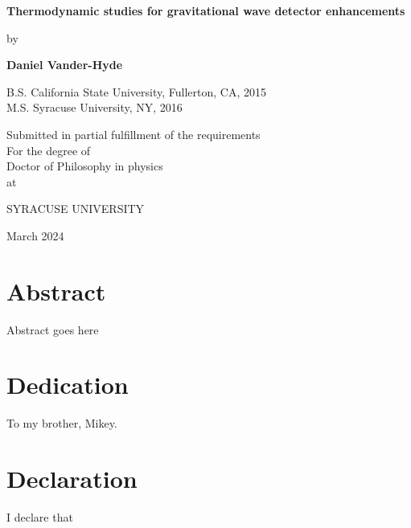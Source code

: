 \documentclass[12pt]{report}
\begin{document}
\begin{titlepage}
\begin{center}
       \vspace*{1cm}

       \textbf{\LARGE Thermodynamic studies for gravitational wave detector enhancements}

       \vspace{0.5cm}
       {\large by}
            
       \vspace{0.5cm}

       \textbf{\large Daniel Vander-Hyde}


       \vspace{0.5cm}
       {\large B.S. California State University, Fullerton, CA, 2015}
       \\
       {\large M.S. Syracuse University, NY, 2016}
       
       \vspace{1.0cm}
             
       {\large Submitted in partial fulfillment of the requirements\\
       For the degree of \\
       Doctor of Philosophy in physics\\
       at}

       \vspace{0.5cm}

       {\large \uppercase{Syracuse University}}
       \vfill
     
       March 2024
            
   \end{center}
\end{titlepage}

\chapter*{Abstract}
Abstract goes here

\chapter*{Dedication}
To my brother, Mikey.

\chapter*{Declaration}
I declare that
\end{document}
